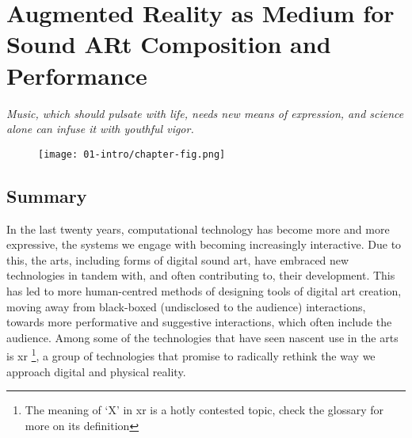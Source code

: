 \chapter{Augmented Reality as Medium for Sound ARt Composition and Performance}
\label{sec: introduction}
\epigraph{\emph{Music, which should pulsate with life, needs new means of expression, and science alone can infuse it with youthful vigor.}}{\citep{varese1966}}

\begin{figure}
    \centering
    \texttt{[image: 01-intro/chapter-fig.png]}
    \captionsetup{labelformat=empty}
    \caption[\autoref{sec: introduction}: \textit{polygons\textasciitilde{}} in performance at the Attenborough Centre for Creative Arts, University of Sussex, on June 8th, (from \citeauthor{bilbow2022a}, \citeyear{bilbow2022a})]{}
\end{figure}

\clearpage
\section{Summary}\label{sec: introduction-summary}
In the last twenty years, computational technology has become more and more expressive, the systems we engage with becoming increasingly interactive. Due to this, the arts, including forms of digital sound art, have embraced new technologies in tandem with, and often contributing to, their development. This has led to more human-centred methods of designing tools of digital art creation, moving away from black-boxed (undisclosed to the audience) interactions, towards more performative and suggestive interactions, which often include the audience. Among some of the technologies that have seen nascent use in the arts is \acf{xr} \footnote{The meaning of `X' in \ac{xr} is a hotly contested topic, check the glossary for more on its definition}, a group of technologies that promise to radically rethink the way we approach digital and physical reality. 

